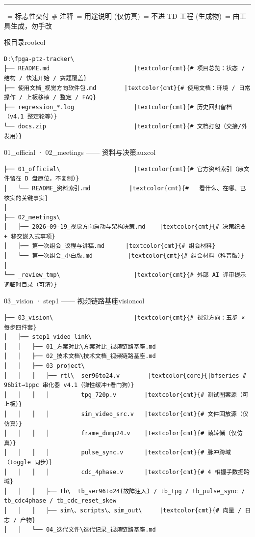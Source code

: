 \documentclass[10pt]{ctexart}
\begin{document}
{\small
\textcolor{core}{\rule[2pt]{2.6mm}{2.6mm}}\;{\color{core}\bfseries [核心]}\ = 标志性交付 \quad
{\color{cmt}\ttfamily\# 注释}\ = 用途说明 \quad
{\ttfamily (仅仿真)}\ = 不进 TD 工程 \quad
{\ttfamily (生成物)}\ = 由工具生成，勿手改
}

\vspace{2.5mm}
\begin{sectbox}{根目录}{rootcol}
\begin{Verbatim}[fontsize=\scriptsize, commandchars=\|\{\}]
D:\fpga-ptz-tracker\
├── README.md                        |textcolor{cmt}{# 项目总览：状态 / 结构 / 快速开始 / 赛题覆盖}
├── 使用文档_视觉方向软件包.md        |textcolor{cmt}{# 使用文档：环境 / 日常操作 / 上板移植 / 整定 / FAQ}
├── regression_*.log                 |textcolor{cmt}{# 历史回归留档（v4.1 整定轮等）}
└── docs.zip                         |textcolor{cmt}{# 文档打包（交接/外发用）}
\end{Verbatim}
\end{sectbox}
\vspace{2.2mm}
\begin{sectbox}{01\_official · 02\_meetings —— 资料与决策}{auxcol}
\begin{Verbatim}[fontsize=\scriptsize, commandchars=\|\{\}]
├── 01_official\                     |textcolor{cmt}{# 官方资料索引（原文件留在 D 盘原位，不复制）}
│   └── README_资料索引.md           |textcolor{cmt}{#   看什么、在哪、已核实的关键事实}
│
├── 02_meetings\
│   ├── 2026-09-19_视觉方向启动与架构决策.md    |textcolor{cmt}{# 决策纪要 + 移交嵌入式事项}
│   ├── 第一次组会_议程与讲稿.md      |textcolor{cmt}{# 组会材料}
│   └── 第一次组会_小白版.md          |textcolor{cmt}{# 组会材料（科普版）}
│
└── _review_tmp\                     |textcolor{cmt}{# 外部 AI 评审提示词临时目录（可清）}
\end{Verbatim}
\end{sectbox}
\vspace{2.2mm}
\begin{sectbox}{03\_vision · step1 —— 视频链路基座}{visioncol}
\begin{Verbatim}[fontsize=\scriptsize, commandchars=\|\{\}]
├── 03_vision\                       |textcolor{cmt}{# 视觉方向：五步 × 每步四件套}
│   ├── step1_video_link\
│   │   ├── 01_方案对比\方案对比_视频链路基座.md
│   │   ├── 02_技术文档\技术文档_视频链路基座.md
│   │   ├── 03_project\
│   │   │   ├── rtl\  ser96to24.v        |textcolor{core}{|bfseries # 96bit→1ppc 串化器 v4.1（弹性缓冲+看门狗）}
│   │   │   │         tpg_720p.v        |textcolor{cmt}{# 测试图案源（可上板）}
│   │   │   │         sim_video_src.v   |textcolor{cmt}{# 文件回放源（仅仿真）}
│   │   │   │         frame_dump24.v    |textcolor{cmt}{# 帧转储（仅仿真）}
│   │   │   │         pulse_sync.v      |textcolor{cmt}{# 脉冲跨域（toggle 同步）}
│   │   │   │         cdc_4phase.v      |textcolor{cmt}{# 4 相握手数据跨域}
│   │   │   ├── tb\  tb_ser96to24(故障注入) / tb_tpg / tb_pulse_sync / tb_cdc4phase / tb_cdc_reset_skew
│   │   │   ├── sim\、scripts\、sim_out\     |textcolor{cmt}{# 向量 / 日志 / 产物}
│   │   └── 04_迭代文件\迭代记录_视频链路基座.md
\end{Verbatim}
\end{sectbox}
\end{document}
